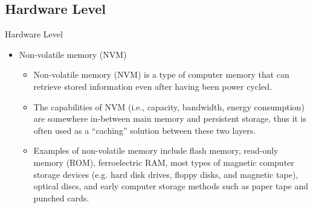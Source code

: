 \documentclass[compress,11pt,xcolor=svgnames,aspectratio=169]{beamer}
\begin{document}
\subsection{Hardware Level}

\begin{frame}[fragile]{Hardware Level}

\begin{itemize}

    \item Non-volatile memory (NVM)\\[0.4cm]

    \begin{itemize}
    \setlength\itemsep{0.6cm}

        \item Non-volatile memory (NVM) is a type of computer memory that can retrieve stored information even after having been power cycled.

        \item The capabilities of NVM (i.e., capacity, bandwidth, energy consumption) are somewhere in-between main memory and persistent storage, thus it is often used as a ``caching'' solution between these two layers.

        \item Examples of non-volatile memory include flash memory, read-only memory (ROM), ferroelectric RAM, most types of magnetic computer storage devices (e.g. hard disk drives, floppy disks, and magnetic tape), optical discs, and early computer storage methods such as paper tape and punched cards.

    \end{itemize}

\end{itemize}

\nocite{3372390}

\end{frame}
\end{document}
